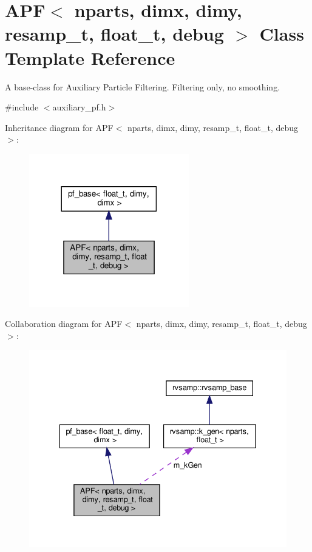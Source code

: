 \hypertarget{classAPF}{}\section{A\+PF$<$ nparts, dimx, dimy, resamp\+\_\+t, float\+\_\+t, debug $>$ Class Template Reference}
\label{classAPF}


A base-\/class for Auxiliary Particle Filtering. Filtering only, no smoothing.  




{\ttfamily \#include $<$auxiliary\+\_\+pf.\+h$>$}



Inheritance diagram for A\+PF$<$ nparts, dimx, dimy, resamp\+\_\+t, float\+\_\+t, debug $>$\+:
\nopagebreak
\begin{figure}[H]
\begin{center}
\leavevmode
\includegraphics[width=197pt]{classAPF__inherit__graph}
\end{center}
\end{figure}


Collaboration diagram for A\+PF$<$ nparts, dimx, dimy, resamp\+\_\+t, float\+\_\+t, debug $>$\+:
\nopagebreak
\begin{figure}[H]
\begin{center}
\leavevmode
\includegraphics[width=336pt]{classAPF__coll__graph}
\end{center}
\end{figure}

